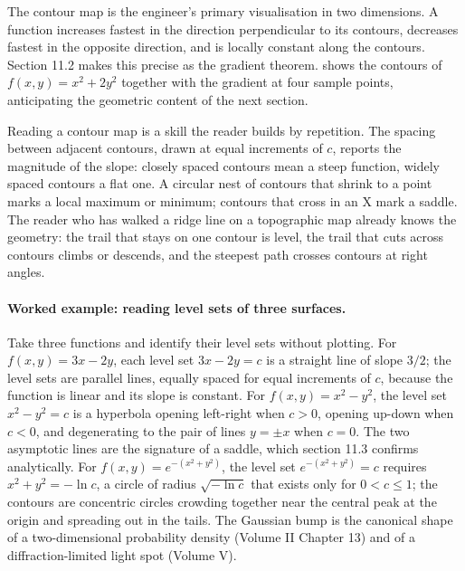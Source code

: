 The contour map is the engineer's primary visualisation in two
dimensions. A function increases fastest in the direction
perpendicular to its contours, decreases fastest in the opposite
direction, and is locally constant along the contours. Section 11.2
makes this precise as the gradient theorem.
 shows the contours of
$f(x, y) = x^{2} + 2 y^{2}$ together with the gradient at four
sample points, anticipating the geometric content of the next
section.



Reading a contour map is a skill the reader builds by repetition.
The spacing between adjacent contours, drawn at equal increments of
$c$, reports the magnitude of the slope: closely spaced contours
mean a steep function, widely spaced contours a flat one. A circular
nest of contours that shrink to a point marks a local maximum or
minimum; contours that cross in an X mark a saddle. The reader who
has walked a ridge line on a topographic map already knows the
geometry: the trail that stays on one contour is level, the trail
that cuts across contours climbs or descends, and the steepest path
crosses contours at right angles.

\paragraph{Worked example: reading level sets of three surfaces.}
Take three functions and identify their level sets without plotting.
For $f(x, y) = 3x - 2y$, each level set $3x - 2y = c$ is a straight
line of slope $3/2$; the level sets are parallel lines, equally
spaced for equal increments of $c$, because the function is linear
and its slope is constant. For $f(x, y) = x^{2} - y^{2}$, the level
set $x^{2} - y^{2} = c$ is a hyperbola opening left-right when
$c > 0$, opening up-down when $c < 0$, and degenerating to the pair
of lines $y = \pm x$ when $c = 0$. The two asymptotic lines are the
signature of a saddle, which section 11.3 confirms analytically. For
$f(x, y) = e^{-(x^{2} + y^{2})}$, the level set $e^{-(x^{2} + y^{2})}
= c$ requires $x^{2} + y^{2} = -\ln c$, a circle of radius
$\sqrt{-\ln c}$ that exists only for $0 < c \leq 1$; the contours are
concentric circles crowding together near the central peak at the
origin and spreading out in the tails. The Gaussian bump is the
canonical shape of a two-dimensional probability density (Volume II
Chapter 13) and of a diffraction-limited light spot (Volume V).

